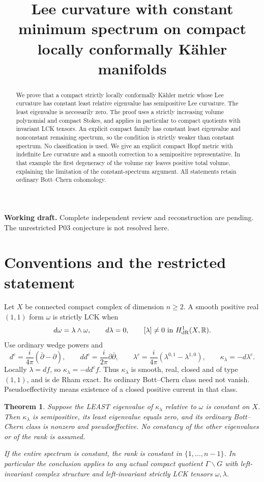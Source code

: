 \documentclass[11pt]{article}
\title{Lee curvature with constant minimum spectrum\newline
on compact locally conformally K\"ahler manifolds}
\author{}\date{}
\newcommand{\ddc}{dd^c}
\newcommand{\dc}{d^c}
\newcommand{\kap}{\kappa_\lambda}
\newtheorem{theorem}{Theorem}
\theoremstyle{remark}\newtheorem{remark}[theorem]{Remark}
\begin{document}
\maketitle
\noindent\textbf{Working draft.} Complete independent review and
reconstruction are pending. The unrestricted P03 conjecture is not
resolved here.
\begin{abstract}
We prove that a compact strictly locally conformally K\"ahler metric
whose Lee curvature has constant least relative eigenvalue has
semipositive Lee curvature. The least eigenvalue is necessarily zero. The proof uses a strictly increasing volume polynomial
and compact Stokes, and applies in particular to compact quotients
with invariant LCK tensors. An explicit compact family has constant
least eigenvalue and nonconstant remaining spectrum, so the condition
is strictly weaker than constant spectrum. No classification is used. We give an explicit compact Hopf metric with indefinite
Lee curvature and a smooth correction to a semipositive representative.
In that example the first degeneracy of the volume ray leaves positive
total volume, explaining the limitation of the constant-spectrum
argument. All statements retain ordinary Bott--Chern cohomology.
\end{abstract}

\section{Conventions and the restricted statement}
Let $X$ be connected compact complex of dimension $n\geq2$. A smooth
positive real $(1,1)$ form $\omega$ is strictly LCK when
\[
 d\omega=\lambda\wedge\omega,\qquad d\lambda=0,
 \qquad [\lambda]\ne0\text{ in }H^1_{\rm dR}(X,\mathbb R).
\]
Use ordinary wedge powers and
\[
 \dc=\frac{i}{4\pi}(\bar\partial-\partial),\qquad
 \ddc=\frac{i}{2\pi}\partial\bar\partial,\qquad
 \lambda^c=\frac{i}{4\pi}(\lambda^{0,1}-\lambda^{1,0}),
 \qquad\kap=-d\lambda^c.
\]
Locally $\lambda=df$, so $\kap=-\ddc f$. Thus $\kap$ is smooth,
real, closed and of type $(1,1)$, and is de Rham exact. Its ordinary
Bott--Chern class need not vanish. Pseudoeffectivity means existence
of a closed positive current in that class.

\begin{theorem}\label{th:constant}
Suppose the LEAST eigenvalue of $\kap$ relative to $\omega$ is
constant on $X$. Then $\kap$ is semipositive, its least eigenvalue
equals zero, and its ordinary Bott--Chern class is nonzero and
pseudoeffective. No constancy of the other eigenvalues or of the
rank is assumed.

If the entire spectrum is constant, the rank is constant in
$\{1,\ldots,n-1\}$. In particular the conclusion applies to any
actual compact quotient $\Gamma\backslash G$ with left-invariant
complex structure and left-invariant strictly LCK tensors
$\omega,\lambda$.
\end{theorem}
\end{document}
